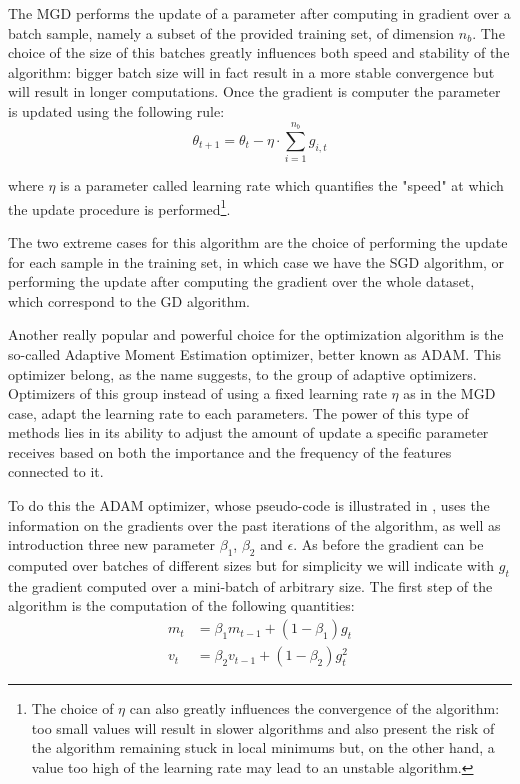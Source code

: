 The MGD performs the update of a parameter after computing in gradient over a batch sample, namely a subset of the provided training set, of dimension $n_b$. The choice of the size of this batches greatly influences both speed and stability of the algorithm: bigger batch size will in fact result in a more stable convergence but will result in longer computations. Once the gradient is computer the parameter is updated using the following rule:
\begin{equation}
\theta_{t+1}=\theta_t-\eta \cdot \sum_{i=1}^{n_b} g_{i,t}
\end{equation}

where $\eta$ is a parameter called learning rate which quantifies the "speed" at which the update procedure is performed\footnote{The choice of $\eta$ can also greatly influences the convergence of the algorithm: too small values will result in slower algorithms and also present the risk of the algorithm remaining stuck in local minimums but, on the other hand, a value too high of the learning rate may lead to an unstable algorithm.}. 

The two extreme cases for this algorithm are the choice of performing the update for each sample in the training set, in which case we have the SGD algorithm, or performing the update after computing the gradient over the whole dataset, which correspond to the GD algorithm. 






Another really popular and powerful choice for the optimization algorithm is the so-called Adaptive Moment Estimation optimizer, better known as ADAM. This optimizer belong, as the name suggests, to the group of adaptive optimizers. Optimizers of this group instead of using a fixed learning rate $\eta$ as in the MGD case, adapt the learning rate to each parameters. 
The power of this type of methods lies in its ability to adjust the amount of update a specific parameter receives based on both the importance and the frequency of the features connected to it. 

To do this the ADAM optimizer, whose pseudo-code is illustrated in , uses the information on the gradients over the past iterations of the algorithm, as well as introduction three new parameter $\beta_1$, $\beta_2$ and $\epsilon$. As before the gradient can be computed over batches of different sizes but for simplicity we will indicate with $g_t$ the gradient computed over a mini-batch of arbitrary size. The first step of the algorithm is the computation of the following quantities:
\begin{equation}
\begin{aligned}
m_{t} &=\beta_{1} m_{t-1}+\left(1-\beta_{1}\right) g_{t} \\
v_{t} &=\beta_{2} v_{t-1}+\left(1-\beta_{2}\right) g_{t}^{2}
\end{aligned}
\end{equation}

